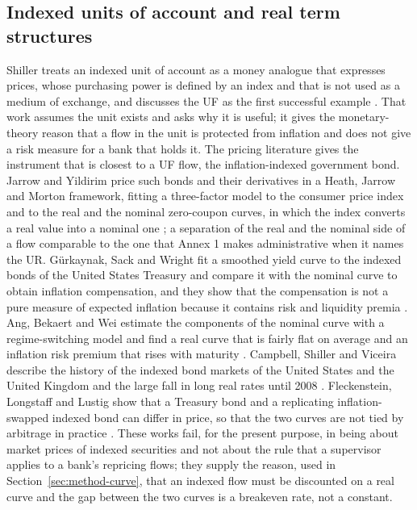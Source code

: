 \subsection{Indexed units of account and real term structures}
\label{sec:rw-indexed}

Shiller treats an indexed unit of account as a money analogue that expresses prices, whose purchasing power is defined by an index and that is not used as a medium of exchange, and discusses the UF as the first successful example \citep{Shiller1998}. That work assumes the unit exists and asks why it is useful; it gives the monetary-theory reason that a flow in the unit is protected from inflation and does not give a risk measure for a bank that holds it. The pricing literature gives the instrument that is closest to a UF flow, the inflation-indexed government bond. Jarrow and Yildirim price such bonds and their derivatives in a Heath, Jarrow and Morton framework, fitting a three-factor model to the consumer price index and to the real and the nominal zero-coupon curves, in which the index converts a real value into a nominal one \citep{Jarrow2003,Heath1992}; a separation of the real and the nominal side of a flow comparable to the one that Annex 1 makes administrative when it names the UR. G\"urkaynak, Sack and Wright fit a smoothed yield curve to the indexed bonds of the United States Treasury and compare it with the nominal curve to obtain inflation compensation, and they show that the compensation is not a pure measure of expected inflation because it contains risk and liquidity premia \citep{Gurkaynak2010}. Ang, Bekaert and Wei estimate the components of the nominal curve with a regime-switching model and find a real curve that is fairly flat on average and an inflation risk premium that rises with maturity \citep{Ang2008}. Campbell, Shiller and Viceira describe the history of the indexed bond markets of the United States and the United Kingdom and the large fall in long real rates until 2008 \citep{Campbell2009}. Fleckenstein, Longstaff and Lustig show that a Treasury bond and a replicating inflation-swapped indexed bond can differ in price, so that the two curves are not tied by arbitrage in practice \citep{Fleckenstein2014}. These works fail, for the present purpose, in being about market prices of indexed securities and not about the rule that a supervisor applies to a bank's repricing flows; they supply the reason, used in Section~\ref{sec:method-curve}, that an indexed flow must be discounted on a real curve and the gap between the two curves is a breakeven rate, not a constant.

